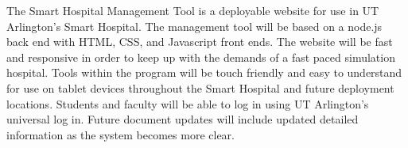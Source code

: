 The Smart Hospital Management Tool is a deployable website for use in UT Arlington's Smart Hospital. The management tool will be based on a node.js back end with HTML, CSS, and Javascript front ends. The website will be fast and responsive in order to keep up with the demands of a fast paced simulation hospital. Tools within the program will be touch friendly and easy to understand for use on tablet devices throughout the Smart Hospital and future deployment locations. Students and faculty will be able to log in using UT Arlington's universal log in. Future document updates will include updated detailed information as the system becomes more clear.
